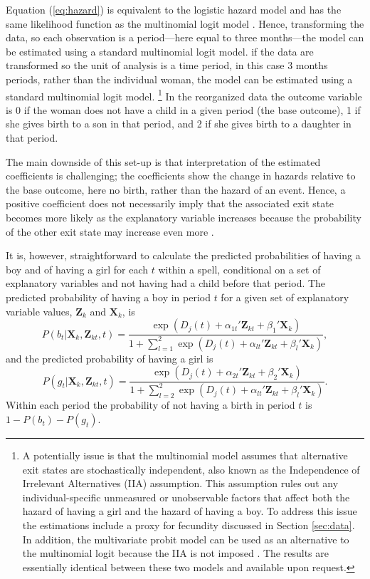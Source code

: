 \documentclass[12pt,letterpaper]{article}
\begin{document}
Equation (\ref{eq:hazard}) is equivalent to the logistic hazard model and has the same 
likelihood function as the multinomial logit model \citep{allison82,jenkins95}.
Hence, transforming the data, so each observation is a period---here equal
to three months---the model can be estimated using a standard multinomial logit model.
if the data are transformed so the unit of analysis is a time period, in 
this case 3 months periods, rather than the individual woman, the model can be 
estimated using a standard multinomial logit model.%
\footnote{
A potentially issue is that the multinomial model assumes that alternative 
exit states are stochastically independent,
also known as the Independence of Irrelevant Alternatives (IIA) assumption.
This assumption rules out any individual-specific unmeasured or 
unobservable factors that affect both the hazard of having a girl and the 
hazard of having a boy.
To address this issue the estimations include a proxy for fecundity
discussed in Section \ref{sec:data}.
In addition, the multivariate probit model can be used as an alternative
to the multinomial logit because the IIA is not imposed \citep{han90}.
The results are essentially identical between these two models and
available upon request.
}
In the reorganized data the outcome variable is 0 if the
woman does not have a child in a given period (the base outcome), 1 if 
she gives birth to a son in that period, and 2 if she gives birth to 
a daughter in that period.

The main downside of this set-up is that interpretation of the estimated 
coefficients is challenging;
the coefficients show the change in hazards relative to the base outcome, 
here no birth, rather than the hazard of an event.
Hence, a positive coefficient does not necessarily imply that the associated 
exit state becomes more likely as the explanatory variable increases because the 
probability of the other exit state may increase even more \citep{thomas96}.

It is, however, straightforward to calculate the predicted probabilities of 
having a boy and of having a girl for each $t$ within a spell, conditional on 
a set of explanatory variables and not having had a child before that period.
The predicted probability of having a boy in period $t$ for a given set of 
explanatory variable values, $\mathbf{Z}_k$ and $\mathbf{X}_k$, is
\begin{equation}
P(b_{t} | \mathbf{X}_{k}, \mathbf{Z}_{kt}, t ) 
=  
\frac{ \exp(D_j(t) + \alpha_{1t}' \mathbf{Z}_{kt} + \beta_1' \mathbf{X}_{k} )}
{1 + \sum_{l=1}^2 \exp(D_j(t) + \alpha_{lt} ' \mathbf{Z}_{kt} + \beta_l ' \mathbf{X}_{k})},
\label{eq:probability_boy}
\end{equation}
and the predicted probability of having a girl is
\begin{equation}
P(g_{t} | \mathbf{X}_{k}, \mathbf{Z}_{kt},t ) 
=  
\frac{ \exp(D_j(t) + \alpha_{2t}'\mathbf{Z}_{kt} + \beta_2'\mathbf{X}_{k} )}
{1 + \sum_{l=2}^2 \exp(D_j(t) + \alpha_{lt}'\mathbf{Z}_{kt} + \beta_l'\mathbf{X}_{k})}.
\label{eq:probability_girl}
\end{equation}
Within each period the probability of not having a birth in period $t$
is $1-P(b_{t})-P(g_{t})$.
\end{document}
